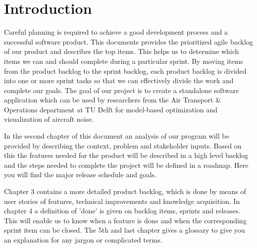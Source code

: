 \section{Introduction}

Careful planning is required to achieve a good development process and a successful software product. This documents provides the prioritized agile backlog of our product and describes the top items. This helps us to determine which items we can and should complete during a particular sprint. By moving items from the product backlog to the sprint backlog, each product backlog is divided into one or more sprint tasks so that we can effectively divide the work and complete our goals. The goal of our project is to create a standalone software application which can be used by researchers from the Air Transport \& Operations department at TU Delft for model-based optimization and visualization of aircraft noise.

In the second chapter of this document an analysis of our program will be provided by describing the context, problem and stakeholder inputs. Based on this the features needed for the product will be described in a high level backlog and the steps needed to complete the project will be defined in a roadmap. Here you will find the major release schedule and goals.

Chapter 3 contains a more detailed product backlog, which is done by means of user stories of features, technical improvements and knowledge acquisition. In chapter 4 a definition of 'done' is given on backlog items, sprints and releases. This will enable us to know when a feature is done and when the corresponding sprint item can be closed. The 5th and last chapter gives a glossary to give you an explanation for any jargon or complicated terms.